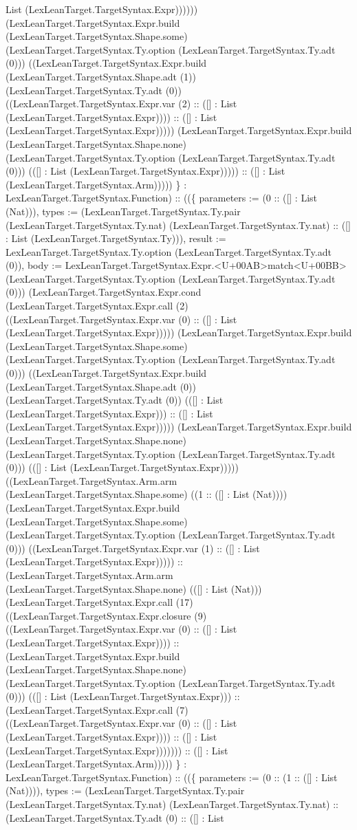 \documentclass[11pt]{article}
\begin{document}
List (LexLeanTarget.TargetSyntax.Expr)))))) (LexLeanTarget.TargetSyntax.Expr.build (LexLeanTarget.TargetSyntax.Shape.some) (LexLeanTarget.TargetSyntax.Ty.option (LexLeanTarget.TargetSyntax.Ty.adt (0))) ((LexLeanTarget.TargetSyntax.Expr.build (LexLeanTarget.TargetSyntax.Shape.adt (1)) (LexLeanTarget.TargetSyntax.Ty.adt (0)) ((LexLeanTarget.TargetSyntax.Expr.var (2) :: ([] : List (LexLeanTarget.TargetSyntax.Expr)))) :: ([] : List (LexLeanTarget.TargetSyntax.Expr))))) (LexLeanTarget.TargetSyntax.Expr.build (LexLeanTarget.TargetSyntax.Shape.none) (LexLeanTarget.TargetSyntax.Ty.option (LexLeanTarget.TargetSyntax.Ty.adt (0))) (([] : List (LexLeanTarget.TargetSyntax.Expr))))) :: ([] : List (LexLeanTarget.TargetSyntax.Arm))))) \} : LexLeanTarget.TargetSyntax.Function) :: ((\{ parameters := (0 :: ([] : List (Nat))), types := (LexLeanTarget.TargetSyntax.Ty.pair (LexLeanTarget.TargetSyntax.Ty.nat) (LexLeanTarget.TargetSyntax.Ty.nat) :: ([] : List (LexLeanTarget.TargetSyntax.Ty))), result := LexLeanTarget.TargetSyntax.Ty.option (LexLeanTarget.TargetSyntax.Ty.adt (0)), body := LexLeanTarget.TargetSyntax.Expr.<U+00AB>match<U+00BB> (LexLeanTarget.TargetSyntax.Ty.option (LexLeanTarget.TargetSyntax.Ty.adt (0))) (LexLeanTarget.TargetSyntax.Expr.cond (LexLeanTarget.TargetSyntax.Expr.call (2) ((LexLeanTarget.TargetSyntax.Expr.var (0) :: ([] : List (LexLeanTarget.TargetSyntax.Expr))))) (LexLeanTarget.TargetSyntax.Expr.build (LexLeanTarget.TargetSyntax.Shape.some) (LexLeanTarget.TargetSyntax.Ty.option (LexLeanTarget.TargetSyntax.Ty.adt (0))) ((LexLeanTarget.TargetSyntax.Expr.build (LexLeanTarget.TargetSyntax.Shape.adt (0)) (LexLeanTarget.TargetSyntax.Ty.adt (0)) (([] : List (LexLeanTarget.TargetSyntax.Expr))) :: ([] : List (LexLeanTarget.TargetSyntax.Expr))))) (LexLeanTarget.TargetSyntax.Expr.build (LexLeanTarget.TargetSyntax.Shape.none) (LexLeanTarget.TargetSyntax.Ty.option (LexLeanTarget.TargetSyntax.Ty.adt (0))) (([] : List (LexLeanTarget.TargetSyntax.Expr))))) ((LexLeanTarget.TargetSyntax.Arm.arm (LexLeanTarget.TargetSyntax.Shape.some) ((1 :: ([] : List (Nat)))) (LexLeanTarget.TargetSyntax.Expr.build (LexLeanTarget.TargetSyntax.Shape.some) (LexLeanTarget.TargetSyntax.Ty.option (LexLeanTarget.TargetSyntax.Ty.adt (0))) ((LexLeanTarget.TargetSyntax.Expr.var (1) :: ([] : List (LexLeanTarget.TargetSyntax.Expr))))) :: (LexLeanTarget.TargetSyntax.Arm.arm (LexLeanTarget.TargetSyntax.Shape.none) (([] : List (Nat))) (LexLeanTarget.TargetSyntax.Expr.call (17) ((LexLeanTarget.TargetSyntax.Expr.closure (9) ((LexLeanTarget.TargetSyntax.Expr.var (0) :: ([] : List (LexLeanTarget.TargetSyntax.Expr)))) :: (LexLeanTarget.TargetSyntax.Expr.build (LexLeanTarget.TargetSyntax.Shape.none) (LexLeanTarget.TargetSyntax.Ty.option (LexLeanTarget.TargetSyntax.Ty.adt (0))) (([] : List (LexLeanTarget.TargetSyntax.Expr))) :: (LexLeanTarget.TargetSyntax.Expr.call (7) ((LexLeanTarget.TargetSyntax.Expr.var (0) :: ([] : List (LexLeanTarget.TargetSyntax.Expr)))) :: ([] : List (LexLeanTarget.TargetSyntax.Expr))))))) :: ([] : List (LexLeanTarget.TargetSyntax.Arm))))) \} : LexLeanTarget.TargetSyntax.Function) :: ((\{ parameters := (0 :: (1 :: ([] : List (Nat)))), types := (LexLeanTarget.TargetSyntax.Ty.pair (LexLeanTarget.TargetSyntax.Ty.nat) (LexLeanTarget.TargetSyntax.Ty.nat) :: (LexLeanTarget.TargetSyntax.Ty.adt (0) :: ([] : List 
\end{document}
